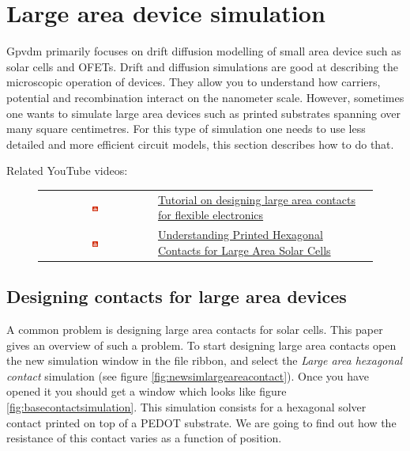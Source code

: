 \newpage
\section{Large area device simulation}
\label{ref:la}
Gpvdm primarily focuses on drift diffusion modelling of small area device such as solar cells and OFETs. Drift and diffusion simulations are good at describing the microscopic operation of devices. They allow you to understand how carriers, potential and recombination interact on the nanometer scale.  However, sometimes one wants to simulate large area devices such as printed substrates spanning over many square centimetres.  For this type of simulation one needs to use less detailed and more efficient circuit models, this section describes how to do that.

Related YouTube videos:
\begin{figure}[H]

\begin{tabular}{ c l }

\includegraphics[width=0.05\textwidth]{./images/youtube.png}

&
\href{https://www.youtube.com/watch?v=XpGr9C_gr7E}{Tutorial on designing large area contacts for flexible electronics}\
\\
\includegraphics[width=0.05\textwidth]{./images/youtube.png}

&
\href{https://www.youtube.com/watch?v=ObBJIE9TmYo}{Understanding Printed Hexagonal Contacts for Large Area Solar Cells}

\end{tabular}
\end{figure}



\subsection{Designing contacts for large area devices}
A common problem is designing large area contacts for solar cells.  This paper \cite{solak2021understanding} gives an overview of such a problem.   To start designing large area contacts open the new simulation window in the file ribbon, and select the \emph{Large area hexagonal contact} simulation (see figure \ref{fig:newsimlargeareacontact}).  Once you have opened it you should get a window which looks like figure \ref{fig:basecontactsimulation}.  This simulation consists for a hexagonal solver contact printed on top of a PEDOT substrate.  We are going to find out how the resistance of this contact varies as a function of position.




